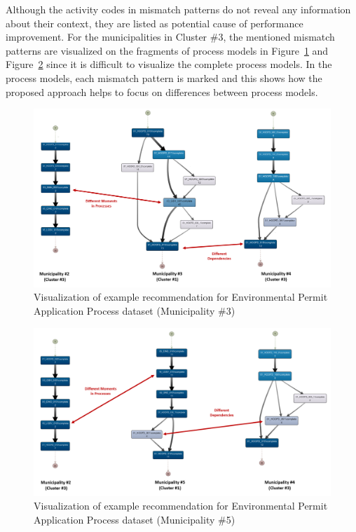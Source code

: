 \begin{itemize}
\begin{itemize}
\begin{itemize}
 		\end{itemize}
	Although the activity codes in mismatch patterns do not reveal any information about their context, they are listed as potential cause of performance improvement. For the municipalities in Cluster \#3, the mentioned mismatch patterns are visualized on the fragments of process models in Figure~\ref{fig:coselog-wabo-recommendation-visualization-mun-3} and Figure~\ref{fig:coselog-wabo-recommendation-visualization-mun-5} since it is difficult to visualize the complete process models. In the process models, each mismatch pattern is marked and this shows how the proposed approach helps to focus on differences between process models.
			\begin{figure}
			\centering
			\includegraphics[width=\textwidth]{5_results_discussions/coselog-wabo/recommendation-visualization-mun-3}
			\caption{Visualization of example recommendation for Environmental Permit Application Process dataset (Municipality \#3)}
		  \label{fig:coselog-wabo-recommendation-visualization-mun-3}
		\end{figure}
				\begin{figure}
			\centering
			\includegraphics[width=\textwidth]{5_results_discussions/coselog-wabo/recommendation-visualization-mun-5}
			\caption{Visualization of example recommendation for Environmental Permit Application Process dataset (Municipality \#5)}
		  \label{fig:coselog-wabo-recommendation-visualization-mun-5}
		\end{figure}
	\end{itemize} %

\end{itemize} %
